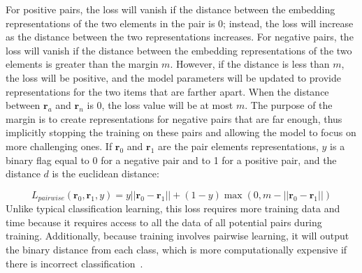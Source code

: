 \documentclass[sn-mathphys-num]{sn-jnl}%
\renewcommand\vec{\mathbf}
\begin{document}
    For positive pairs, the loss will vanish if the distance between the embedding representations of the two elements in the pair is 0; instead, the loss will increase as the distance between the two representations increases. For negative pairs, the loss will vanish if the distance between the embedding representations of the two elements is greater than the margin $m$. However, if the distance is less than $m$, the loss will be positive, and the model parameters will be updated to provide representations for the two items that are farther apart. When the distance between $\vec{r}_a$ and $\vec{r}_n$ is 0, the loss value will be at most $m$. The purpose of the margin is to create representations for negative pairs that are far enough, thus implicitly stopping the training on these pairs and allowing the model to focus on more challenging ones. If $\vec{r}_0$ and $\vec{r}_1$ are the pair elements representations, $y$ is a binary flag equal to 0 for a negative pair and to 1 for a positive pair, and the distance $d$ is the euclidean distance:

    
    \begin{equation}
        {L}_{pairwise}(\vec{r}_0,\vec{r}_1,y) = y||\vec{r}_0-\vec{r}_1||+(1-y)\max(0,m-||\vec{r}_0-\vec{r}_1||)
    \end{equation}
Unlike typical classification learning, this loss requires more training data and time because it requires access to all the data of all potential pairs during training. Additionally, because training involves pairwise learning, it will output the binary distance from each class, which is more computationally expensive if there is incorrect classification~\cite{koch2015siamese}. 
\end{document}
